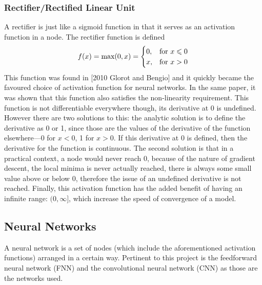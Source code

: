 \documentclass[a4paper,fleqn,usenatbib]{mnras}
\begin{document}
\subsubsection{Rectifier/Rectified Linear Unit}
A rectifier is just like a sigmoid function in that it serves as an activation function in a node. The rectifier function is defined
\begin{equation}
f(x)=\textnormal{max}(0,x)= \begin{cases} 0, & \mbox{for } x\leq0 \\ x, & \mbox{for } x>0 \end{cases}	
\end{equation}
This function was found in [2010 Glorot and Bengio] and it quickly became the favoured choice of activation function for neural networks. In the same paper, it was shown that this function also satisfies the non-linearity requirement. This function is not differentiable everywhere though, its derivative at 0 is undefined. However there are two solutions to this: the analytic solution is to define the derivative as 0 or 1, since those are the values of the derivative of the function elsewhere---0 for $x<0$, 1 for $x>0$. If this derivative at 0 is defined, then the derivative for the function is continuous. The second solution is that in a practical context, a node would never reach 0, because of the nature of gradient descent, the local minima is never actually reached, there is always some small value above or below 0, therefore the issue of an undefined derivative is not reached. Finally, this activation function has the added benefit of having an infinite range: $(0,\infty]$, which increase the speed of convergence of a model.

\subsection{Neural Networks}
A neural network is a set of nodes (which include the aforementioned activation functions) arranged in a certain way. Pertinent to this project is the feedforward neural network (FNN) and the convolutional neural network (CNN) as those are the networks used.
\end{document}

